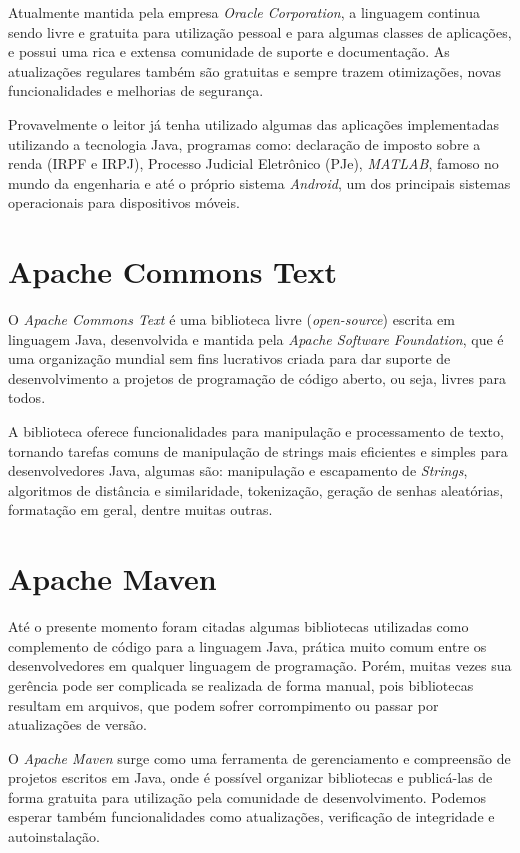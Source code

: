 \documentclass[
	12pt,			%
	openright,		%
	oneside,	
	a4paper,		%
	english,		%
	brazil			%
]{abntex2/abntex2}  %
\begin{document}
			Atualmente mantida pela empresa \textit{Oracle Corporation}, a linguagem continua sendo livre e gratuita para utilização pessoal e para algumas classes de aplicações, e possui uma rica e extensa comunidade de suporte e documentação. As atualizações regulares também são gratuitas e sempre trazem otimizações, novas funcionalidades e melhorias de segurança.

			Provavelmente o leitor já tenha utilizado algumas das aplicações implementadas utilizando a tecnologia Java, programas como: declaração de imposto sobre a renda (IRPF e IRPJ), Processo Judicial Eletrônico (PJe), \textit{MATLAB}, famoso no mundo da engenharia e até o próprio sistema \textit{Android}, um dos principais sistemas operacionais para dispositivos móveis.
		
		\section{Apache Commons Text\texttrademark} \label{commons-text}
		
			O \textit{Apache Commons Text\texttrademark} \cite{commons-text} é uma biblioteca livre (\textit{open-source}) escrita em linguagem Java, desenvolvida e mantida pela \textit{Apache Software Foundation}, que é uma organização mundial sem fins lucrativos criada para dar suporte de desenvolvimento a projetos de programação de código aberto, ou seja, livres para todos.
			
			A biblioteca oferece funcionalidades para manipulação e processamento de texto, tornando tarefas comuns de manipulação de strings mais eficientes e simples para desenvolvedores Java, algumas são: manipulação e escapamento de \textit{Strings}, algoritmos de distância e similaridade, tokenização, geração de senhas aleatórias, formatação em geral, dentre muitas outras.
		
		\section{Apache Maven} \label{maven}
		
			Até o presente momento foram citadas algumas bibliotecas utilizadas como complemento de código para a linguagem Java, prática muito comum entre os desenvolvedores em qualquer linguagem de programação. Porém, muitas vezes sua gerência pode ser complicada se realizada de forma manual, pois bibliotecas resultam em arquivos, que podem sofrer corrompimento ou passar por atualizações de versão.
		
			O \textit{Apache Maven} \cite{maven} surge como uma ferramenta de gerenciamento e compreensão de projetos escritos em Java, onde é possível organizar bibliotecas e publicá-las de forma gratuita para utilização pela comunidade de desenvolvimento. Podemos esperar também funcionalidades como atualizações, verificação de integridade e autoinstalação.
		
\end{document}
